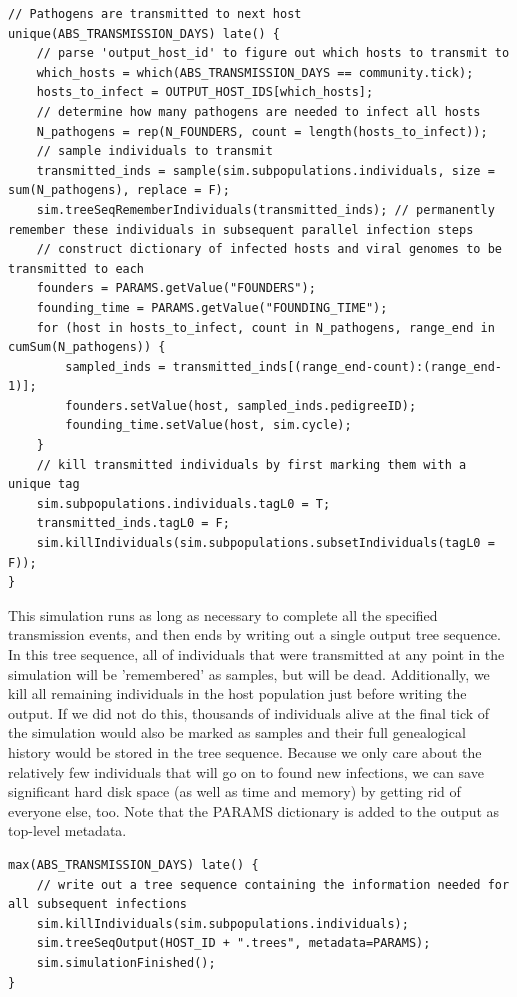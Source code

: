 \documentclass[12pt]{article}
\begin{document}
\begin{verbatim}
// Pathogens are transmitted to next host
unique(ABS_TRANSMISSION_DAYS) late() {
	// parse 'output_host_id' to figure out which hosts to transmit to
	which_hosts = which(ABS_TRANSMISSION_DAYS == community.tick);
	hosts_to_infect = OUTPUT_HOST_IDS[which_hosts];
	// determine how many pathogens are needed to infect all hosts
	N_pathogens = rep(N_FOUNDERS, count = length(hosts_to_infect));
	// sample individuals to transmit
	transmitted_inds = sample(sim.subpopulations.individuals, size = sum(N_pathogens), replace = F);
	sim.treeSeqRememberIndividuals(transmitted_inds); // permanently remember these individuals in subsequent parallel infection steps
	// construct dictionary of infected hosts and viral genomes to be transmitted to each
	founders = PARAMS.getValue("FOUNDERS");
	founding_time = PARAMS.getValue("FOUNDING_TIME");
	for (host in hosts_to_infect, count in N_pathogens, range_end in cumSum(N_pathogens)) {
		sampled_inds = transmitted_inds[(range_end-count):(range_end-1)];
		founders.setValue(host, sampled_inds.pedigreeID);
		founding_time.setValue(host, sim.cycle);
	}
	// kill transmitted individuals by first marking them with a unique tag
	sim.subpopulations.individuals.tagL0 = T;
	transmitted_inds.tagL0 = F;
	sim.killIndividuals(sim.subpopulations.subsetIndividuals(tagL0 = F));
}
\end{verbatim}

This simulation runs as long as necessary to complete all the specified transmission events, and then ends by writing out a single output tree sequence. In this tree sequence, all of
individuals that were transmitted at any point in the simulation will be 'remembered' as samples, but will be dead. Additionally, we kill all remaining individuals in the host population
just before writing the output. If we did not do this, thousands of individuals alive at the final tick of the simulation would also be marked as samples and their full genealogical history
would be stored in the tree sequence. Because we only care about the relatively few individuals that will go on to found new infections, we can save significant hard disk space
(as well as time and memory) by getting rid of everyone else, too. Note that the PARAMS dictionary is added to the output as top-level metadata.

\begin{verbatim}
max(ABS_TRANSMISSION_DAYS) late() {
	// write out a tree sequence containing the information needed for all subsequent infections
	sim.killIndividuals(sim.subpopulations.individuals);
	sim.treeSeqOutput(HOST_ID + ".trees", metadata=PARAMS);
	sim.simulationFinished();
}
\end{verbatim}
\end{document}
